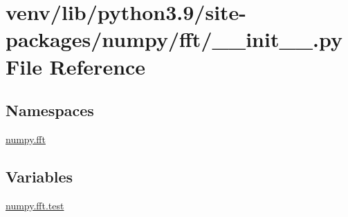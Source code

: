 \hypertarget{venv_2lib_2python3_89_2site-packages_2numpy_2fft_2____init_____8py}{}\section{venv/lib/python3.9/site-\/packages/numpy/fft/\+\_\+\+\_\+init\+\_\+\+\_\+.py File Reference}
\label{venv_2lib_2python3_89_2site-packages_2numpy_2fft_2____init_____8py}
\subsection*{Namespaces}
\begin{DoxyCompactItemize}
\item 
 \hyperlink{namespacenumpy_1_1fft}{numpy.\+fft}
\end{DoxyCompactItemize}
\subsection*{Variables}
\begin{DoxyCompactItemize}
\item 
\hyperlink{namespacenumpy_1_1fft_ad7324baa30d876111354e55fa02a3a56}{numpy.\+fft.\+test}
\end{DoxyCompactItemize}
